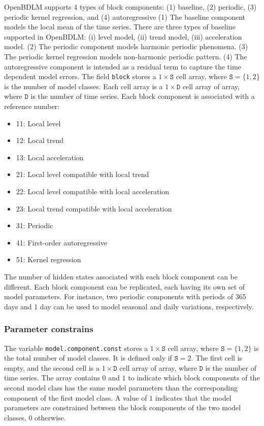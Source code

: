 OpenBDLM supports 4 types of block components: (1) baseline, (2) periodic, (3) periodic kernel regression, and (4) autoregressive 
(1) The baseline component models the local mean of the time series. 
There are three types of baseline supported in OpenBDLM: (i) level model, (ii) trend model, (iii) acceleration model. 
(2) The periodic component models harmonic periodic phenomena. %
(3) The periodic kernel regression models non-harmonic periodic pattern.
(4) The autoregressive component is intended as a residual term to capture the time dependent model errors.
The field \lstinline[basicstyle = \mlttfamily \small ]!block! stores a $1\times \mathtt{S}$ cell array, where $\mathtt{S} = \{1,2 \}$ is the number of model classes.
Each cell array is a $1\times \mathtt{D}$ cell array of array, where $\mathtt{D}$ is the number of time series.
Each block component is associated with a reference number:
\begin{itemize}
\item 11: Local level 
\item 12: Local trend
\item 13: Local acceleration
\item 21: Local level compatible with local trend
\item 22: Local level compatible with local acceleration
\item 23: Local trend compatible with local acceleration
\item 31: Periodic
\item 41: First-order autoregressive
\item 51: Kernel regression
\end{itemize}
The number of hidden states associated with each block component can be different. 
Each block component can be replicated, each having its own set of model parameters. 
For instance, two periodic components with periods of 365 days and 1 day can be used to model seasonal and daily variations, respectively.

\subsubsection{Parameter constrains}

The variable \lstinline[basicstyle = \mlttfamily]!model.component.const! stores a $1\times \mathtt{S}$ cell array, where $\mathtt{S} = \{1, 2 \}$ is the total number of model classes.
It is defined only if $\mathtt{S} = 2$.
The first cell is empty, and the second cell is a $1\times \mathtt{D}$ cell array of array, where $\mathtt{D}$ is the number of time series.
The array contains $0$ and $1$ to indicate which block components of the second model class has the same model parameters than the corresponding component of the first model class. 
A value of $1$ indicates that the model parameters are constrained between the block components of the two model classes, $0$ otherwise.

